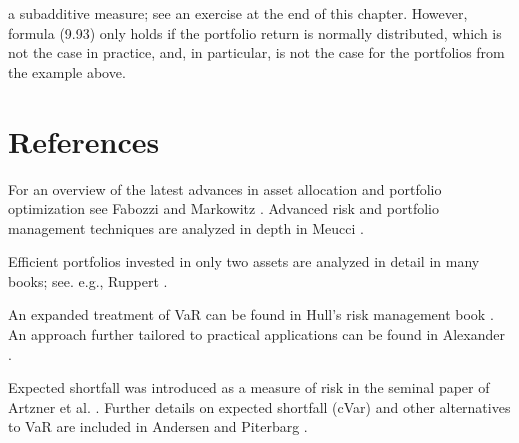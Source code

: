 a subadditive measure; see an exercise at the end of this chapter. However,
formula (9.93) only holds if the portfolio return is normally distributed,
which is not the case in practice, and, in particular, is not the case for
the portfolios from the example above.

\section{References}

For an overview of the latest advances in asset allocation and portfolio
optimization see Fabozzi and Markowitz \cite{14}. Advanced risk and portfolio
management techniques are analyzed in depth in Meucci \cite{29}.

Efficient portfolios invested in only two assets are analyzed in detail in
many books; see. e.g., Ruppert \cite{33}.

An expanded treatment of VaR can be found in Hull's risk management book
\cite{23}. An approach further tailored to practical applications can be
found in Alexander \cite{2}.

Expected shortfall was introduced as a measure of risk in the seminal paper
of Artzner et al. \cite{6}. Further details on expected shortfall (cVar) and
other alternatives to VaR are included in Andersen and Piterbarg \cite{4}.
